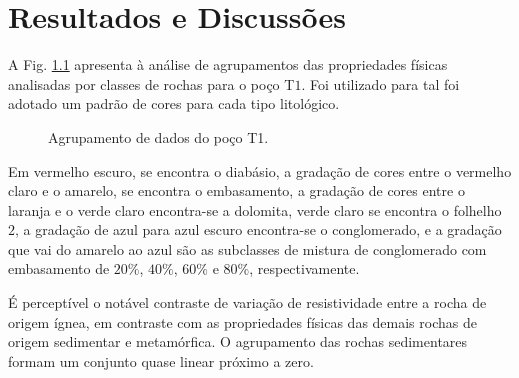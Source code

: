 \chapter{Resultados e Discussões}

A Fig. \ref{clusterT1} apresenta à análise de agrupamentos das propriedades físicas analisadas por classes de rochas para o poço T$1$. Foi utilizado para tal foi adotado um padrão de cores para cada tipo litológico. 

\begin{figure}[H]
	\centering
	\setlength{\fboxsep}{8pt}
	\setlength{\fboxrule}{0.1pt}
	\caption{Agrupamento de dados do poço T1.}
	\label{clusterT1}
\end{figure} 

Em vermelho escuro, se encontra o diabásio, a gradação de cores entre o vermelho claro e o amarelo, se encontra o embasamento, a gradação de cores entre o laranja e o verde claro encontra-se a dolomita, verde claro se encontra o folhelho $2$, a gradação de azul para azul escuro encontra-se o conglomerado, e a gradação que vai do amarelo ao azul são as subclasses de mistura de conglomerado com embasamento de $20\%$, $40\%$, $60\%$ e $80\%$, respectivamente.

É perceptível o notável contraste de variação de resistividade entre a rocha de origem ígnea, em contraste com as propriedades físicas das demais rochas de origem sedimentar e metamórfica. O agrupamento das rochas sedimentares formam um conjunto quase linear próximo a zero.

